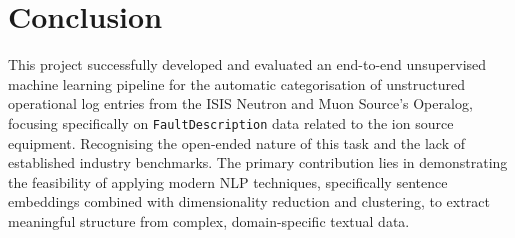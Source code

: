\documentclass[10pt,oneside]{report}
\begin{document}

\chapter{Conclusion}\label{chap:conclusion}

This project successfully developed and evaluated an end-to-end unsupervised machine learning pipeline for the automatic categorisation of unstructured operational log entries from the ISIS Neutron and Muon Source's Operalog, focusing specifically on \texttt{FaultDescription} data related to the ion source equipment. Recognising the open-ended nature of this task and the lack of established industry benchmarks. The primary contribution lies in demonstrating the feasibility of applying modern NLP techniques, specifically sentence embeddings combined with dimensionality reduction and clustering, to extract meaningful structure from complex, domain-specific textual data.
\end{document}
